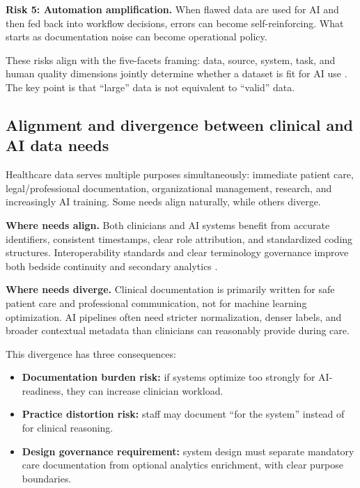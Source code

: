 \textbf{Risk 5: Automation amplification.}
When flawed data are used for AI and then fed back into workflow decisions, errors can become self-reinforcing. What starts as documentation noise can become operational policy.

These risks align with the five-facets framing: data, source, system, task, and human quality dimensions jointly determine whether a dataset is fit for AI use \parencite{mohammed2025fivefacets}. The key point is that ``large'' data is not equivalent to ``valid'' data.

\subsection{Alignment and divergence between clinical and AI data needs}
\label{subsec:a2_alignment_divergence}

Healthcare data serves multiple purposes simultaneously: immediate patient care, legal/professional documentation, organizational management, research, and increasingly AI training. Some needs align naturally, while others diverge.

\textbf{Where needs align.}
Both clinicians and AI systems benefit from accurate identifiers, consistent timestamps, clear role attribution, and standardized coding structures. Interoperability standards and clear terminology governance improve both bedside continuity and secondary analytics \parencite{benson2016principles,hildebrandt2026process}.

\textbf{Where needs diverge.}
Clinical documentation is primarily written for safe patient care and professional communication, not for machine learning optimization. AI pipelines often need stricter normalization, denser labels, and broader contextual metadata than clinicians can reasonably provide during care.

This divergence has three consequences:
\begin{itemize}
    \item \textbf{Documentation burden risk:} if systems optimize too strongly for AI-readiness, they can increase clinician workload.
    \item \textbf{Practice distortion risk:} staff may document ``for the system'' instead of for clinical reasoning.
    \item \textbf{Design governance requirement:} system design must separate mandatory care documentation from optional analytics enrichment, with clear purpose boundaries.
\end{itemize}


